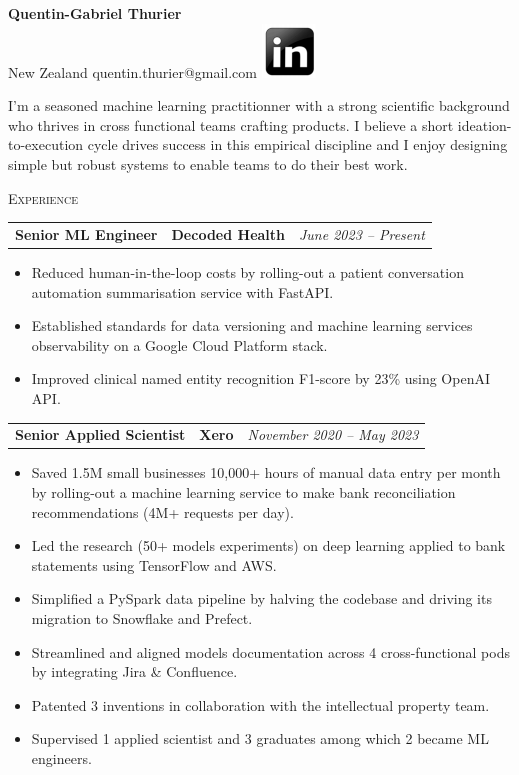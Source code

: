 \documentclass[letterpaper,11pt]{article}
\renewcommand{\section}[1]{{\vspace{0.3cm}}{\scshape\color{blue}#1}{\color{blue}\hrulefill}{\vspace{0.2cm}}}
\newcommand{\resumeItemListStart}{\begin{itemize}[label=$\circ$, topsep=0.1cm, parsep=0cm, partopsep=0cm, itemsep=0.1cm, leftmargin=0.4cm]}
\newcommand{\resumeItem}[1]{\item\small{#1}}
\newcommand{\resumeJustifiedItem}[1]{\item\begin{justify}\small{#1}\end{justify}}
\newcommand{\resumeItemListEnd}{\end{itemize}}
\newcommand{\job}[4]{
    \begin{tabular}{p{7cm}p{6cm}p{5cm}}
      \hspace{-0.7em} \textbf{#1} & \textbf{\small{#2}} & \hfill \textit{\small{#4}}
    \end{tabular}
}
\begin{document}
 

\begin{center}
  \textbf{\Large Quentin-Gabriel Thurier} \\
  \small{New Zealand} \textbar{}
  \small{quentin.thurier@gmail.com} \textbar{}
  \href{https://www.linkedin.com/in/quentin-gabriel-thurier-36586021/}{\includegraphics[scale=0.6,valign=b]{linkedin}} %
\end{center}

\begin{justify}
  I'm a seasoned machine learning practitionner with a strong scientific background who thrives in cross functional teams crafting products. I believe a short ideation-to-execution cycle drives success in this empirical discipline and I enjoy designing simple but robust systems to enable teams to do their best work.
\end{justify}

\vspace{-0.2cm}

\section{Experience}

\job {Senior ML Engineer}{Decoded Health}{Auckland}{June 2023 -- Present}
\resumeItemListStart
\resumeItem {Reduced human-in-the-loop costs by rolling-out a patient conversation automation summarisation service with FastAPI.}
\resumeItem {Established standards for data versioning and machine learning services observability on a Google Cloud Platform stack.}
\resumeItem {Improved clinical named entity recognition F1-score by 23\% using OpenAI API.}
\resumeItemListEnd \vspace{0.2cm}

\job {Senior Applied Scientist}{Xero}{Auckland}{November 2020 -- May 2023}
\resumeItemListStart
\resumeJustifiedItem {Saved 1.5M small businesses 10,000+ hours of manual data entry per month by rolling-out a machine learning service to make bank reconciliation recommendations (4M+ requests per day).}
\resumeItem {Led the research (50+ models experiments) on deep learning applied to bank statements using TensorFlow and AWS.}
\resumeItem {Simplified a PySpark data pipeline by halving the codebase and driving its migration to Snowflake and Prefect.}
\resumeItem {Streamlined and aligned models documentation across 4 cross-functional pods by integrating Jira \& Confluence.}
\resumeItem {Patented 3 inventions in collaboration with the intellectual property team.}
\resumeItem {Supervised 1 applied scientist and 3 graduates among which 2 became ML engineers.}
\resumeItemListEnd \vspace{0.2cm}
\end{document}
